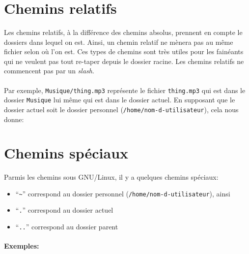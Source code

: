 \documentclass[french, a4paper, 12pt, titlepage]{article}
\begin{document}
\section{Chemins relatifs}

\paragraph{} Les chemins relatifs, à la différence des chemins absolus,
prennent en compte le dossiers dans lequel on est. Ainsi, un chemin relatif ne
mènera pas au même fichier selon où l'on est. Ces types de chemins sont très
utiles pour les fainéants qui ne veulent pas tout re-taper depuis le dossier
racine. Les chemins relatifs ne commencent pas par un \emph{slash}.

\paragraph{} Par exemple, \texttt{Musique/thing.mp3} représente le fichier
\texttt{thing.mp3} qui est dans le dossier \texttt{Musique} lui même qui est
dans le dossier actuel. En supposant que le dossier actuel soit le dossier
personnel (\texttt{/home/nom-d-utilisateur}), cela nous donne:
\\

\section{Chemins spéciaux}

\paragraph{} Parmis les chemins sous GNU/Linux, il y a quelques chemins
spéciaux:

\begin{itemize}
	\item ``\texttt{\~}'' correspond au dossier personnel
		(\texttt{/home/nom-d-utilisateur}), ainsi
	\item ``\texttt{.}'' correspond au dossier actuel\\
	\item ``\texttt{..}'' correspond au dossier parent\\
\end{itemize}

\paragraph{Exemples:}~\\
\end{document}
